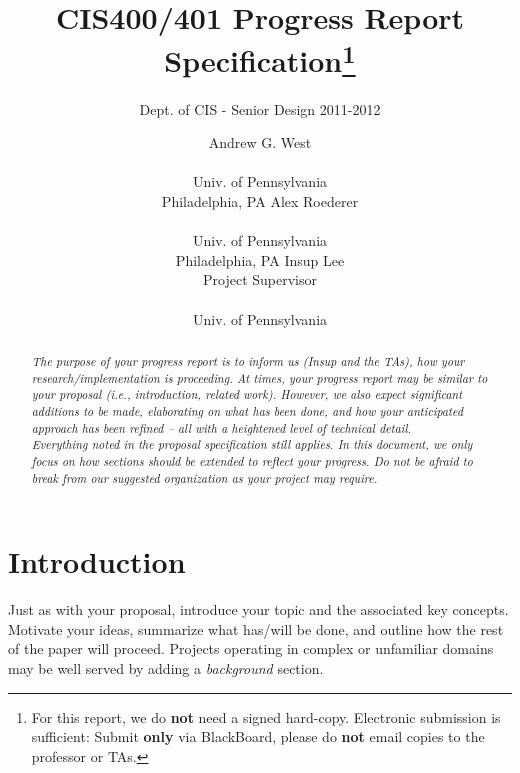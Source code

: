\documentclass{sig-alternate}
\begin{document}
 

\title{CIS400/401 Progress Report Specification\thanks{For this report, we do \textbf{not} need a signed hard-copy. Electronic submission is sufficient:  Submit \textbf{only} via BlackBoard, please do \textbf{not} email copies to the professor or TAs.}}
\subtitle{Dept. of CIS - Senior Design 2011-2012}
\author{
\alignauthor Andrew G. West \\  \\ Univ. of Pennsylvania \\ Philadelphia, PA
\alignauthor Alex Roederer \\  \\ Univ. of Pennsylvania \\ Philadelphia, PA
\alignauthor Insup Lee \\ Project Supervisor \\  \\ Univ. of Pennsylvania}
\date{}
\maketitle

\begin{abstract}
\textit{The purpose of your progress report is to inform us (Insup and the TAs), how your research/implementation is proceeding. At times, your progress report may be similar to your proposal (\textit{i.e.,} introduction, related work). However, we also expect significant additions to be made, elaborating on what has been done, and how your anticipated approach has been refined -- all with a heightened level of technical detail. \\
\indent Everything noted in the proposal specification still applies. In this document, we only focus on how sections should be extended to reflect your progress. Do not be afraid to break from our suggested organization as your project may require.} 
\end{abstract}


\section{Introduction}
\label{sec:intro}
Just as with your proposal, introduce your topic and the associated key concepts. Motivate your ideas, summarize what has/will be done, and outline how the rest of the paper will proceed. Projects operating in complex or unfamiliar domains may be well served by adding a \textit{background} section. 
\end{document}
